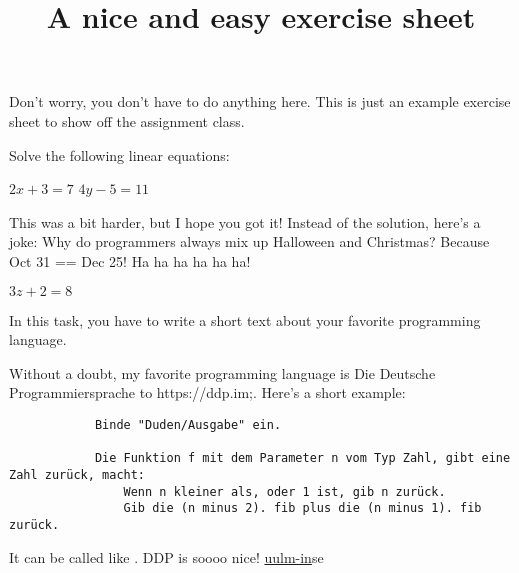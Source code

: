 \documentclass[english,solution]{uulm-assignment}
\title{A nice and easy exercise sheet}
\begin{document}
	\maketitle

	Don't worry, you don't have to do anything here. This is just an example exercise
	sheet to show off the assignment class.

	Solve the following linear equations:
	\begin{subtasks}
		\item \(2x + 3 = 7\) 
		\optitem \(4y - 5 = 11\)
			\begin{solution}
				This was a bit harder, but I hope you got it! Instead of the solution,
				here's a joke:
				Why do programmers always mix up Halloween and Christmas? Because Oct 31
				== Dec 25! Ha ha ha ha ha ha!
			\end{solution}
		\item \(3z + 2 = 8\) 
	\end{subtasks}

	In this task, you have to write a short text about your favorite programming
	language.
	\begin{solution}
		Without a doubt, my favorite programming language is \link  Die Deutsche
		Programmiersprache to https://ddp.im;. Here's a short example:
		\begin{lstlisting}
			Binde "Duden/Ausgabe" ein.

			Die Funktion f mit dem Parameter n vom Typ Zahl, gibt eine Zahl zurück, macht:
				Wenn n kleiner als, oder 1 ist, gib n zurück.
				Gib die (n minus 2). fib plus die (n minus 1). fib zurück.
		\end{lstlisting}
		It can be called like . DDP is soooo nice!
		\ul{uulm-in}{s}{e}{}
	\end{solution}
\end{document}
